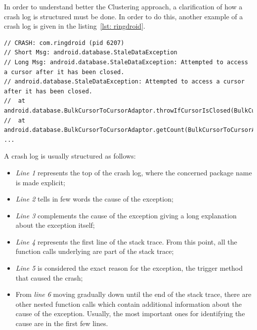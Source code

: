 In order to understand better the Clustering approach, a clarification of how a crash log is structured must be done. In order to do this, another example of a crash log is given in the listing~\ref{lst: ringdroid}. 
\begin{lstlisting}[caption=Structure of a crash log, basicstyle=\fontsize{6}{8}\ttfamily,label={lst: ringdroid}]
// CRASH: com.ringdroid (pid 6207)
// Short Msg: android.database.StaleDataException
// Long Msg: android.database.StaleDataException: Attempted to access a cursor after it has been closed.
// android.database.StaleDataException: Attempted to access a cursor after it has been closed.
// 	at android.database.BulkCursorToCursorAdaptor.throwIfCursorIsClosed(BulkCursorToCursorAdaptor.java:64)
// 	at android.database.BulkCursorToCursorAdaptor.getCount(BulkCursorToCursorAdaptor.java:70)
...
\end{lstlisting}
A crash log is usually structured as follows: 
\begin{itemize}
\item \textit{Line 1} represents the top of the crash log, where the concerned package name is made explicit;
\item \textit{Line 2} tells in few words the cause of the exception; 
\item \textit{Line 3} complements the cause of the exception giving a long explanation about the exception itself;
\item \textit{Line 4} represents the first line of the stack trace. From this point, all the function calls underlying are part of the stack trace;
\item \textit{Line 5} is considered the exact reason for the exception, \ie the trigger method that caused the crash;
\item From \textit{line 6} moving gradually down until the end of the stack trace, there are other nested function calls which contain additional information about the cause of the exception. Usually, the most important ones for identifying the cause are in the first few lines. 
\end{itemize}

